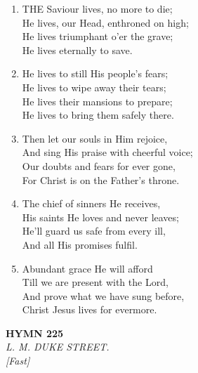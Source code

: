 \begin{enumerate}
    \item THE Saviour lives, no more to die; \\
        He lives, our Head, enthroned on high; \\
        He lives triumphant o'er the grave; \\
        He lives eternally to save.

    \item He lives to still His people's fears; \\
        He lives to wipe away their tears; \\
        He lives their mansions to prepare; \\
        He lives to bring them safely there.

    \item Then let our souls in Him rejoice, \\
        And sing His praise with cheerful voice; \\
        Our doubts and fears for ever gone, \\
        For Christ is on the Father's throne.

    \item The chief of sinners He receives, \\
        His saints He loves and never leaves; \\
        He'll guard us safe from every ill, \\
        And all His promises fulfil.

    \item Abundant grace He will afford \\
        Till we are present with the Lord, \\
        And prove what we have sung before, \\
        Christ Jesus lives for evermore.

\end{enumerate}

\newpage
\begin{center}
    {\Large \textbf{HYMN 225}}
    \\
    \textit{L. M. DUKE STREET.}
    \\
    \textit{\small [Fast]}
\end{center}
\vspace{1em}


